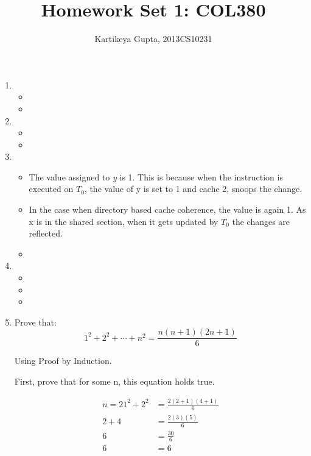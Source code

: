 \documentclass[11pt]{article}
\begin{document}
\author{Kartikeya Gupta, 2013CS10231}
\title{Homework Set 1: COL380}
\maketitle

\begin{enumerate}
\item %
	\begin{itemize}
		\item 
		\item 
	\end{itemize}
\item %
	\begin{itemize}
			\item
			\item
	\end{itemize}
\item %
	\begin{itemize}
			\item The value assigned to \textit{y} is 1. This is because when the instruction is executed on $T_0$, the value of y is set to 1 and cache 2, snoops the change.
			\item In the case when directory based cache coherence, the value is again 1. As x is in the shared section, when it gets updated by $T_0$ the changes are reflected.
			\item 
	\end{itemize}
\item %
	\begin{itemize}
		\item
		\item
		\item
	\end{itemize}

\item %

Prove that:
\[
1^2 + 2^2 + \cdots + n^2 = \frac{n(n+1)(2n+1)}{6}
\]

Using Proof by Induction.

First, prove that for some n, this equation holds true.

\begin{align*}
n = 2
1^2 + 2^2 & = \frac{2(2+1)(4+1)}{6} \\
2 + 4 & = \frac{2(3)(5)}{6} \\
6 &= \frac{30}{6} \\
6 &= 6
\end{align*}


\end{enumerate}
\end{document}
